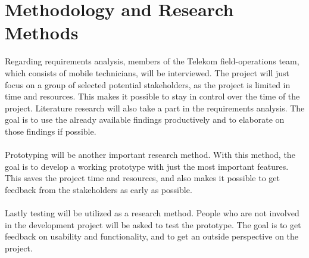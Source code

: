 \newpage
\section{Methodology and Research Methods}
Regarding requirements analysis, members of the Telekom field-operations team, which consists of
mobile technicians, will be interviewed. The project will just focus on a group of selected potential
stakeholders, as the project is limited in time and resources. This makes it possible to stay in 
control over the time of the project. Literature research will also take a part in the requirements 
analysis. The goal is to use the already available findings productively and to elaborate on
those findings if possible. \\ \\
Prototyping will be another important research method. With this method, the goal is to develop a 
working prototype with just the most important features. This saves the project time and resources,
and also makes it possible to get feedback from the stakeholders as early as possible. \\ \\
Lastly testing will be utilized as a research method. People who are not involved in the development 
project will be asked to test the prototype. The goal is to get feedback on usability and functionality, 
and to get an outside perspective on the project. \\